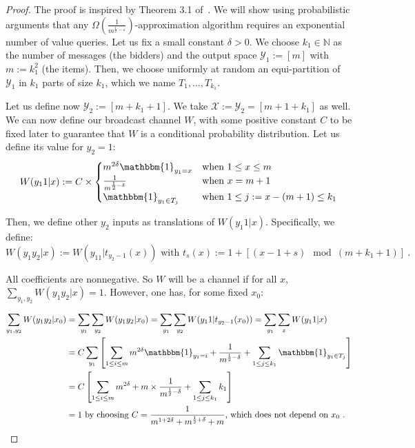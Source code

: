 \begin{proof}
  The proof is inspired by Theorem 3.1 of~\cite{MSV08}. We will show using probabilistic arguments that any $\Omega\left(\frac{1}{m^{\frac{1}{2}-\varepsilon}}\right)$-approximation algorithm requires an exponential number of value queries.
  Let us fix a small constant $\delta > 0$. We choose $k_1 \in \mathbb{N}$ as the number of messages (the bidders) and the output space $\mathcal{Y}_1 := [m]$ with $m := k_1^2$ (the items). Then, we choose uniformly at random an equi-partition of $\mathcal{Y}_1$ in $k_1$ parts of size $k_1$, which we name $T_1, \ldots, T_{k_1}$.

  Let us define now $\mathcal{Y}_2 := [m+k_1+1]$. We take $\mathcal{X} := \mathcal{Y}_2 = [m+1+k_1]$ as well. We can now define our broadcast channel $W$, with some positive constant $C$ to be fixed later to guarantee that $W$ is a conditional probability distribution. Let us define its value for $y_2=1$:
  \[ W(y_1 1|x) := C\times\begin{cases}
    m^{2\delta}\mathbbm{1}_{y_1=x} & \text{when } 1 \leq x \leq m\\
  \frac{1}{m^{\frac{1}{2}-\delta}} & \text{when } x = m+1\\
  \mathbbm{1}_{y_1 \in T_j} & \text{when } 1 \leq j := x-(m+1) \leq k_1\\
  \end{cases}
  \]

  Then, we define other $y_2$ inputs as translations of $W(y_1 1|x)$. Specifically, we define:
  \[ W(y_1y_2|x) := W(y_11|t_{y_2-1}(x)) \text{ with } t_s(x) := 1 + [(x-1+s) \mod (m+k_1+1)] \ .\] 

  All coefficients are nonnegative. So $W$ will be a channel if for all $x$, $\sum_{y_1,y_2} W(y_1 y_2|x) = 1$. However, one has, for some fixed $x_0$:

  \begin{equation}
    \begin{aligned}
      \sum_{y_1,y_2} W(y_1 y_2|x_0) &= \sum_{y_1} \sum_{y_2} W(y_1 y_2|x_0) = \sum_{y_1} \sum_{y_2}  W(y_1 1|t_{y_2-1}(x_0)) = \sum_{y_1} \sum_x  W(y_1 1|x) \\
      &= C \sum_{y_1}\left[\sum_{1 \leq i \leq m} m^{2\delta}\mathbbm{1}_{y_1=i} + \frac{1}{m^{\frac{1}{2}-\delta}} + \sum_{1 \leq j \leq k_1} \mathbbm{1}_{y_1 \in T_j}\right]\\
      &= C \left[\sum_{1 \leq i \leq m} m^{2\delta} + m\times\frac{1}{m^{\frac{1}{2}-\delta}} + \sum_{1 \leq j \leq k_1} k_1\right]\\
      &= 1 \text{ by choosing } C = \frac{1}{m^{1+2\delta} + m^{\frac{1}{2}+\delta} + m} \text{, which does not depend on } x_0  \ .
    \end{aligned}
  \end{equation}


\end{proof}
